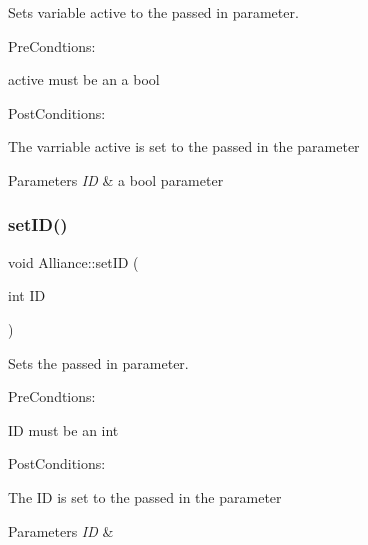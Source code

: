Sets variable active to the passed in parameter. 

Pre\+Condtions\+:
\begin{DoxyItemize}
\item active must be an a bool
\end{DoxyItemize}

Post\+Conditions\+:
\begin{DoxyItemize}
\item The varriable active is set to the passed in the parameter
\end{DoxyItemize}


\begin{DoxyParams}{Parameters}
{\em ID} & a bool parameter \\
\hline
\end{DoxyParams}
\mbox{\label{classAlliance_ace044c4ae0ede7f19990279f163b6f37}} 
\subsubsection{\texorpdfstring{set\+I\+D()}{setID()}}
{\footnotesize\ttfamily void Alliance\+::set\+ID (\begin{DoxyParamCaption}\item[{int}]{ID }\end{DoxyParamCaption})}



Sets the passed in parameter. 

Pre\+Condtions\+:
\begin{DoxyItemize}
\item ID must be an int
\end{DoxyItemize}

Post\+Conditions\+:
\begin{DoxyItemize}
\item The ID is set to the passed in the parameter
\end{DoxyItemize}


\begin{DoxyParams}{Parameters}
{\em ID} & \\
\hline
\end{DoxyParams}
\mbox{\label{classAlliance_a80f9a001ba5bad946690111b775c2349}} 
